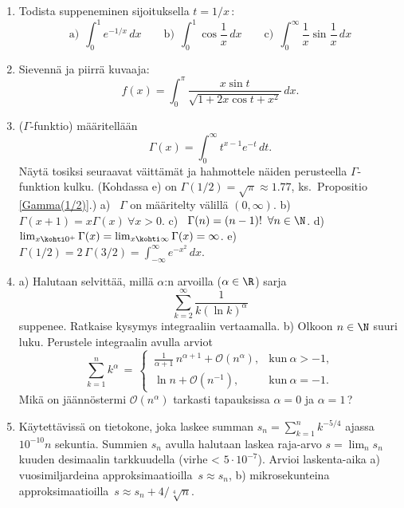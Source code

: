 \begin{enumerate}
\item
Todista suppeneminen sijoituksella $t=1/x$\,:
\[
\text{a)}\ \ \int_0^1 e^{-1/x}\,dx \qquad
\text{b)}\ \ \int_0^1 \cos\frac{1}{x}\,dx \qquad
\text{c)}\ \ \int_0^\infty \frac{1}{x}\sin\frac{1}{x}\,dx
\]

\item
Sievennä ja piirrä kuvaaja:
\[
f(x)=\int_0^\pi \frac{x\sin t}{\sqrt{1+2x\cos t+x^2}}\,dx.
\]

\item \label{H-int-7: Gamma} 
 ($\Gamma$-funktio) määritellään 
\[
\Gamma(x)=\int_0^{\infty} t^{x-1} e^{-t}\,dt.
\]
Näytä tosiksi seuraavat väittämät ja hahmottele näiden perusteella
$\Gamma$-\-funktion kulku. (Kohdassa e) on $\Gamma(1/2)=\sqrt{\pi} \approx 1.77$, ks.\
Propositio \ref{Gamma(1/2)}.) \vspace{1.5mm}\newline
a) \ $\Gamma$ on määritelty välillä $(0,\infty)$. \newline
b) \ $\Gamma(x+1) = x \Gamma(x)\ \forall x>0$. \newline
c) \ $\Gamma(n)=(n-1)!\,\ \forall n\in\N$. \newline
d) \ $\lim_{x \kohti 0^+} \Gamma(x)=\lim_{x\kohti\infty} \Gamma(x)=\infty$. \newline
e) \ $\Gamma(1/2)=2\,\Gamma(3/2)=\int_{-\infty}^\infty e^{-x^2}\,dx$.
\item
a) Halutaan selvittää, millä $\alpha$:n arvoilla ($\alpha\in\R$) sarja
\[
\sum_{k=2}^\infty \frac{1}{k(\ln k)^\alpha}
\]
suppenee. Ratkaise kysymys integraaliin vertaamalla. \vspace{1mm}\newline
b) Olkoon $n\in\N$ suuri luku. Perustele integraalin avulla arviot
\[
\sum_{k=1}^n k^\alpha \,=\,
    \begin{cases}
    \,\frac{1}{\alpha+1}\,n^{\alpha+1}+\mathcal{O}(n^\alpha), &\text{kun}\ \alpha>-1, \\
    \,\ln n+\mathcal{O}(n^{-1}),                               &\text{kun}\ \alpha=-1.
                        \end{cases}
\]
Mikä on jäännöstermi $\mathcal{O}(n^\alpha)$ tarkasti tapauksissa $\alpha=0$ ja $\alpha=1$\,?

\item \label{H-int-7: hidas sarja}
Käytettävissä on tietokone, joka laskee summan $s_n=\sum_{k=1}^n k^{-5/4}$ ajassa $10^{-10}n$
sekuntia. Summien $s_n$ avulla halutaan laskea raja-arvo $s=\lim_ns_n$ kuuden desimaalin
tarkkuudella (virhe < $5 \cdot 10^{-7}$). Arvioi laskenta-aika \newline
a) vuosimiljardeina approksimaatioilla $\,s \approx s_n$, \newline
b) mikrosekunteina approksimaatioilla $\,s \approx s_n+4/\sqrt[4]{n}$.


\end{enumerate}
